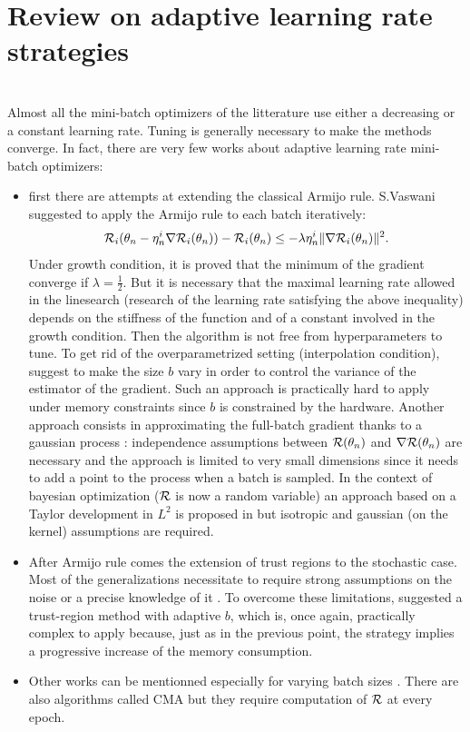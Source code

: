 \section{Review on adaptive learning rate strategies}
\label{adapt}
~~\\
Almost all the mini-batch optimizers of the litterature use either a decreasing or a constant learning rate. 
Tuning is generally necessary to make the methods converge. In fact, there are very few works about adaptive learning rate mini-batch optimizers:
\begin{itemize}
	\item first there are attempts at extending the classical Armijo rule. S.Vaswani \cite{stochastic_armijo} suggested to apply the Armijo rule to each batch iteratively:
	\begin{equation*}
		\mathcal{R}_i(\theta_n-\eta_n^i \nabla \mathcal{R}_i(\theta_n))-\mathcal{R}_i(\theta_n) \leq -\lambda \eta_n^i \|\nabla \mathcal{R}_i(\theta_n)\|^2.
	\end{equation*}
	Under growth condition, it is proved that the minimum of the gradient converge if $\lambda=\frac12$. But it is necessary that the maximal learning rate allowed in the
        linesearch (research of the learning rate satisfying the above inequality) depends on the stiffness of the function and of a constant involved in the growth condition. Then
        the algorithm is not free from hyperparameters to tune. To get rid of the overparametrized setting (interpolation condition),
        \cite{armijo_batch_size,armijo_variance_reduction} suggest to make the size $b$ vary in order to control the variance of the estimator of the gradient. Such an approach is
        practically hard to apply 
        under memory constraints since $b$ is constrained by the hardware. Another approach consists in approximating the full-batch gradient thanks to a gaussian process
        \cite{armijo_GP}: %
        independence assumptions between $\mathcal{R}(\theta_n)$ and $\nabla \mathcal{R}(\theta_n)$ are necessary and the approach is limited to very small dimensions since it needs to add a point to the process when a batch is sampled. In the context of bayesian optimization ($\mathcal{R}$ is now a random variable) an approach based on a Taylor development in $L^2$ is proposed in \cite{armijo_L2} but isotropic and gaussian (on the kernel) assumptions are required. 
	\item After Armijo rule comes the extension of trust regions to the stochastic case. Most of the generalizations necessitate to require strong assumptions on the noise
          \cite{sto_TR_bounded} or a precise knowledge of it \cite{sto_TR_affine_noise,sto_TR_representative}. To overcome these limitations, \cite{sto_TR_sampling} suggested a
          trust-region method with adaptive $b$, which is, once again, practically complex to apply 
          because, just as in the previous point, the strategy implies a progressive increase of the memory consumption. %
	\item Other works can be mentionned especially for varying batch sizes \cite{adaptive_sampling,adaptive_batch,sgd_lauched}. There are also algorithms called CMA \cite{CMA,CMA_Light} but they require computation of $\mathcal{R}$ at every epoch.
\end{itemize}
